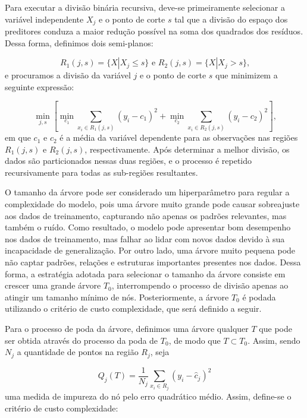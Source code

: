 \documentclass[
  12pt,
  a4paper,
]{scrreprt}
\begin{document}
\vspace{12pt}

Para executar a divisão binária recursiva, deve-se primeiramente
selecionar a variável independente \(X_j\) e o ponto de corte \(s\) tal
que a divisão do espaço dos preditores conduza a maior redução possível
na soma dos quadrados dos resíduos. Dessa forma, definimos dois
semi-planos:

\[
R_{1}\left(j, s\right) = \{X | X_j \leq s\} \text{ e } R_{2}\left(j, s\right) = \{X | X_j > s\}\text{,}
\] e procuramos a divisão da variável \(j\) e o ponto de corte \(s\) que
minimizem a seguinte expressão:

\[
\min_{j, s}\left[\min_{c_1} \sum_{x_i \in R_1\left(j, s\right)} \left(y_i - c_{1}\right)^2 + \min_{c_2} \sum_{x_i \in R_2\left(j, s\right)} \left(y_i - c_{2}\right)^2\right]\text{,}
\] em que \(c_1\) e \(c_2\) é a média da variável dependente para as
observações nas regiões \(R_1\left(j, s\right)\) e
\(R_2\left(j, s\right)\), respectivamente. Após determinar a melhor
divisão, os dados são particionados nessas duas regiões, e o processo é
repetido recursivamente para todas as sub-regiões resultantes.

\vspace{12pt}

O tamanho da árvore pode ser considerado um hiperparâmetro para regular
a complexidade do modelo, pois uma árvore muito grande pode causar
sobreajuste aos dados de treinamento, capturando não apenas os padrões
relevantes, mas também o ruído. Como resultado, o modelo pode apresentar
bom desempenho nos dados de treinamento, mas falhar ao lidar com novos
dados devido à sua incapacidade de generalização. Por outro lado, uma
árvore muito pequena pode não captar padrões, relações e estruturas
importantes presentes nos dados. Dessa forma, a estratégia adotada para
selecionar o tamanho da árvore consiste em crescer uma grande árvore
\(T_0\), interrompendo o processo de divisão apenas ao atingir um
tamanho mínimo de nós. Posteriormente, a árvore \(T_0\) é podada
utilizando o critério de custo complexidade, que será definido a seguir.

\vspace{12pt}

Para o processo de poda da árvore, definimos uma árvore qualquer \(T\)
que pode ser obtida através do processo da poda de \(T_0\), de modo que
\(T \subset T_0\). Assim, sendo \(N_j\) a quantidade de pontos na região
\(R_j\), seja

\[
Q_j\left(T\right) = \frac{1}{N_j} \sum_{x_i \in R_j}\left(y_i - \hat{c}_j\right)^2
\] uma medida de impureza do nó pelo erro quadrático médio. Assim,
define-se o critério de custo complexidade:
\end{document}
